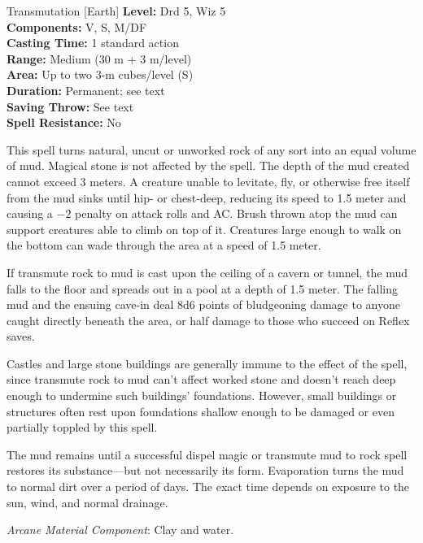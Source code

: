 {Transmutation [Earth]}
{
	\textbf{Level:}
	Drd 5, Wiz 5\\
	\textbf{Components:}
	V, S, M/DF\\
	\textbf{Casting Time:}
	1 standard action\\
	\textbf{Range:}
	Medium (30 m + 3 m/level)\\
	\textbf{Area:}
	Up to two 3-m cubes/level (S)\\
	\textbf{Duration:}
	Permanent; see text\\
	\textbf{Saving Throw:}
	See text\\
	\textbf{Spell Resistance:}
	No\\
}
{
	This spell turns natural, uncut or unworked rock of any sort into an equal volume of mud. Magical stone is not affected by the spell. The depth of the mud created cannot exceed 3 meters. A creature unable to levitate, fly, or otherwise free itself from the mud sinks until hip- or chest-deep, reducing its speed to 1.5 meter and causing a $-2$ penalty on attack rolls and AC. Brush thrown atop the mud can support creatures able to climb on top of it. Creatures large enough to walk on the bottom can wade through the area at a speed of 1.5 meter.

	If transmute rock to mud is cast upon the ceiling of a cavern or tunnel, the mud falls to the floor and spreads out in a pool at a depth of 1.5 meter. The falling mud and the ensuing cave-in deal 8d6 points of bludgeoning damage to anyone caught directly beneath the area, or half damage to those who succeed on Reflex saves.

	Castles and large stone buildings are generally immune to the effect of the spell, since transmute rock to mud can't affect worked stone and doesn't reach deep enough to undermine such buildings' foundations. However, small buildings or structures often rest upon foundations shallow enough to be damaged or even partially toppled by this spell.

	The mud remains until a successful dispel magic or transmute mud to rock spell restores its substance---but not necessarily its form. Evaporation turns the mud to normal dirt over a period of days. The exact time depends on exposure to the sun, wind, and normal drainage.

	\textit{Arcane Material Component}:
	Clay and water.

}
